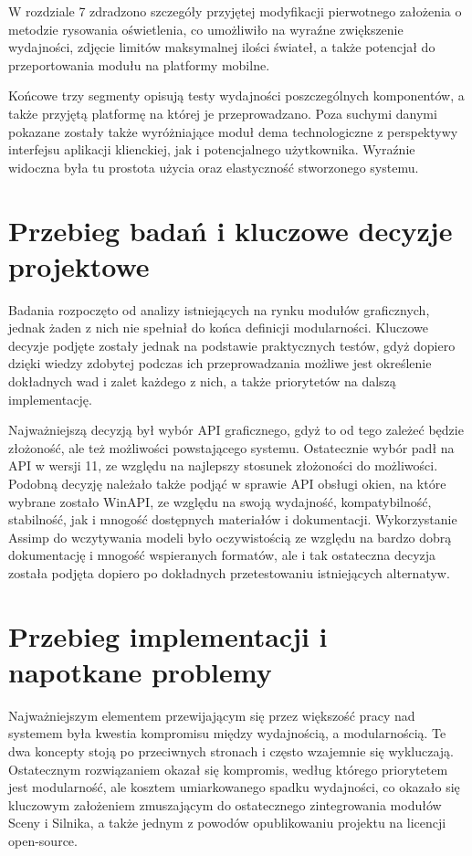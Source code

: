 W rozdziale 7 zdradzono szczegóły przyjętej modyfikacji pierwotnego założenia o metodzie rysowania oświetlenia, co umożliwiło na wyraźne zwiększenie wydajności, zdjęcie limitów maksymalnej ilości świateł, a także potencjał do przeportowania modułu na platformy mobilne. 

Końcowe trzy segmenty opisują testy wydajności poszczególnych komponentów, a także przyjętą platformę na której je przeprowadzano. Poza suchymi danymi pokazane zostały także wyróżniające moduł dema technologiczne z perspektywy interfejsu aplikacji klienckiej, jak i potencjalnego użytkownika. Wyraźnie widoczna była tu prostota użycia oraz elastyczność stworzonego systemu. 

\section{Przebieg badań i kluczowe decyzje projektowe}
Badania rozpoczęto od analizy istniejących na rynku modułów graficznych, jednak żaden z nich nie spełniał do końca definicji modularności. Kluczowe decyzje podjęte zostały jednak na podstawie praktycznych testów, gdyż dopiero dzięki wiedzy zdobytej podczas ich przeprowadzania możliwe jest określenie dokładnych wad i zalet każdego z nich, a także priorytetów na dalszą implementację.

Najważniejszą decyzją był wybór API graficznego, gdyż to od tego zależeć będzie złożoność, ale też możliwości powstającego systemu. Ostatecznie wybór padł na API w wersji 11, ze względu na najlepszy stosunek złożoności do możliwości. Podobną decyzję należało także podjąć w sprawie API obsługi okien, na które wybrane zostało WinAPI, ze względu na swoją wydajność, kompatybilność, stabilność, jak i mnogość dostępnych materiałów i dokumentacji. Wykorzystanie Assimp do wczytywania modeli było oczywistością ze względu na bardzo dobrą dokumentację i mnogość wspieranych formatów, ale i tak ostateczna decyzja została podjęta dopiero po dokładnych przetestowaniu istniejących alternatyw. 

\section{Przebieg implementacji i napotkane problemy}
Najważniejszym elementem przewijającym się przez większość pracy nad systemem była kwestia kompromisu między wydajnością, a modularnością. Te dwa koncepty stoją po przeciwnych stronach i często wzajemnie się wykluczają. Ostatecznym rozwiązaniem okazał się kompromis, według którego priorytetem jest modularność, ale kosztem umiarkowanego spadku wydajności, co okazało się kluczowym założeniem zmuszającym do ostatecznego zintegrowania modułów Sceny i Silnika, a także jednym z powodów opublikowaniu projektu na licencji open-source. 

